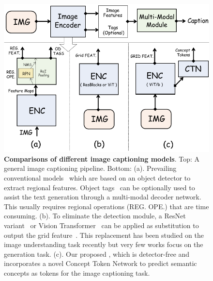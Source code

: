 \begin{figure}[t!]
 \vspace{-3mm}
  \begin{center}
    \includegraphics[width=.76\textwidth]{./images/vit_cap.pdf} 
  \end{center}
  \vspace{-5mm}
    \caption[Comparisons of different image captioning models.]{\small \textbf{Comparisons of different image captioning models}. Top: A general image captioning pipeline. Bottom: (a). Prevailing conventional models~\citep{li2019scale,zhang2021multi,hu2020vivo} which are based on an object detector to extract regional features. 
    Object tags~\citep{li2020oscar,zhang2021multi} can be optionally used to assist the text generation through a multi-modal decoder network. This usually requires regional operations (REG. OPE.) that are time consuming.
    (b). To eliminate the detection module, a ResNet variant~\citep{he2016deep} or Vision Transformer~\citep{kim2021vilt} can be applied as substitution to output the grid feature~\citep{xu2021e2e,wang2021simvlm}. 
    This replacement has been studied on the image understanding task recently but very few works
    focus on the generation task. 
    (c). Our proposed \vitcapp\!\!, which is detector-free and incorporates a novel Concept Token Network
    to predict semantic concepts as tokens for the image captioning task.
    }
    \vspace{-2mm}
  \label{fig:abstract}
\end{figure}

